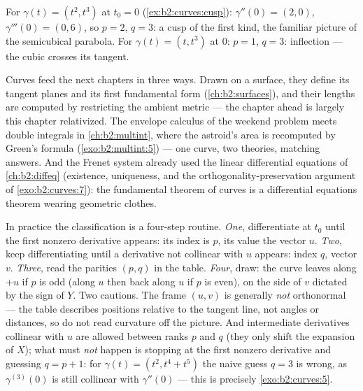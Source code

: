 \begin{example}
For $\gamma(t) = (t^2, t^3)$ at $t_0 = 0$
(\cref{ex:b2:curves:cusp}): $\gamma'' (0)= (2, 0)$, $\gamma'''(0) =
(0, 6)$, so $p = 2$, $q = 3$: a cusp of the first kind, the
familiar picture of the semicubical parabola. For $\gamma(t) = (t,
t^3)$ at $0$: $p = 1$, $q = 3$: inflection --- the cubic crosses
its tangent.
\end{example}

\begin{remark}
Curves feed the next chapters in three ways. Drawn on a
surface, they define its tangent planes and its first
fundamental form (\cref{ch:b2:surfaces}), and their lengths
are computed by restricting the ambient metric --- the
chapter ahead is largely this chapter relativized. The
envelope calculus of the weekend problem meets double
integrals in \cref{ch:b2:multint}, where the astroid's area
is recomputed by Green's formula
(\cref{exo:b2:multint:5}) --- one curve, two theories,
matching answers. And the Frenet system already used the
linear differential equations of \cref{ch:b2:diffeq}
(existence, uniqueness, and the orthogonality-preservation
argument of \cref{exo:b2:curves:7}): the fundamental theorem
of curves is a differential equations theorem wearing
geometric clothes.
\end{remark}

\begin{remark}
In practice the classification is a four-step routine.
\emph{One}, differentiate at $t_0$ until the first nonzero
derivative appears: its index is $p$, its value the vector
$u$. \emph{Two}, keep differentiating until a derivative
not collinear with $u$ appears: index $q$, vector $v$.
\emph{Three}, read the parities $(p, q)$ in the table.
\emph{Four}, draw: the curve leaves along $+u$ if $p$ is odd
(along $u$ then back along $u$ if $p$ is even), on the side
of $v$ dictated by the sign of $Y$. Two cautions. The frame
$(u, v)$ is generally \emph{not} orthonormal --- the table
describes positions relative to the tangent line, not angles
or distances, so do not read curvature off the picture.
And intermediate derivatives collinear with $u$ are allowed
between ranks $p$ and $q$ (they only shift the expansion of
$X$); what must \emph{not} happen is stopping at the first
nonzero derivative and guessing $q = p + 1$: for $\gamma(t)
= (t^2, t^4 + t^5)$ the naive guess $q = 3$ is wrong, as
$\gamma^{(3)}(0)$ is still collinear with $\gamma''(0)$ ---
this is precisely \cref{exo:b2:curves:5}.
\end{remark}

